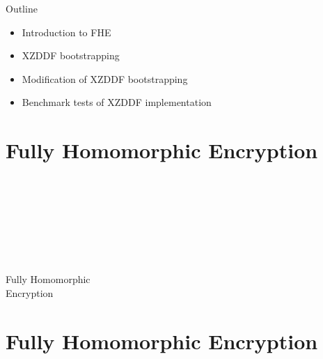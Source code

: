 \documentclass[aspectratio=169]{beamer}
\begin{document}
\begin{frame}{Outline}
    \begin{itemize}
        \item Introduction to FHE
    \end{itemize}
        \begin{itemize}
        \item XZDDF bootstrapping
    \end{itemize}
        \begin{itemize}
        \item Modification of XZDDF bootstrapping
    \end{itemize}
        \begin{itemize}
        \item Benchmark tests of XZDDF implementation
    \end{itemize}
\end{frame}




\section{Fully Homomorphic Encryption}

\begin{frame}{\\~\\~\\~\\~\\~\\~\\ \huge \text{\;\;\;\;\;\;\;\;\;\;} Fully Homomorphic \\ \text{\;\;\;\;\;\;\;\;\;\;\;\;\;\;\;\;\;}  Encryption}
\end{frame}

\section{Fully Homomorphic Encryption}
\end{document}
